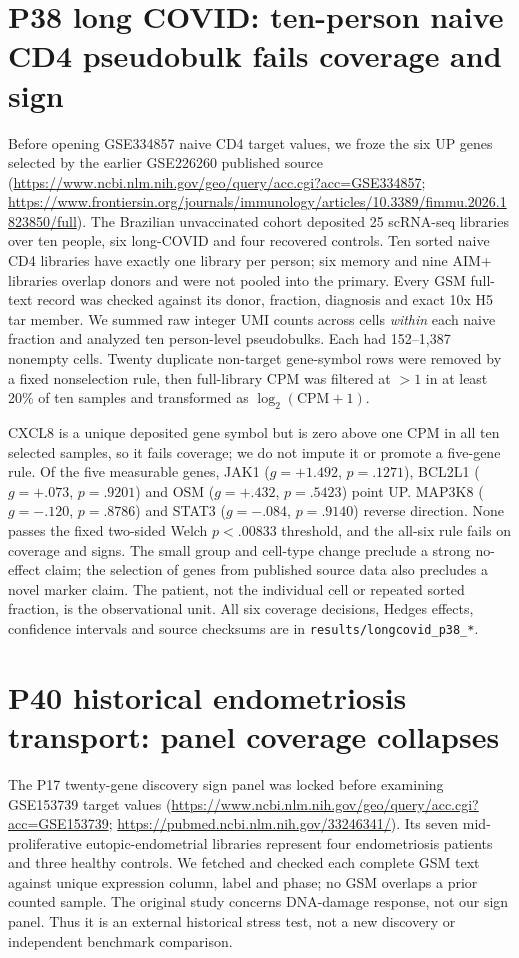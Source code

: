 \documentclass[11pt,a4paper]{article}
\begin{document}
\section{P38 long COVID: ten-person naive CD4 pseudobulk fails coverage and sign}
Before opening GSE334857 naive CD4 target values, we froze the six UP genes selected by the earlier GSE226260 published source (\url{https://www.ncbi.nlm.nih.gov/geo/query/acc.cgi?acc=GSE334857}; \url{https://www.frontiersin.org/journals/immunology/articles/10.3389/fimmu.2026.1823850/full}). The Brazilian unvaccinated cohort deposited 25 scRNA-seq libraries over ten people, six long-COVID and four recovered controls. Ten sorted naive CD4 libraries have exactly one library per person; six memory and nine AIM+ libraries overlap donors and were not pooled into the primary. Every GSM full-text record was checked against its donor, fraction, diagnosis and exact 10x H5 tar member. We summed raw integer UMI counts across cells \emph{within} each naive fraction and analyzed ten person-level pseudobulks. Each had 152--1,387 nonempty cells. Twenty duplicate non-target gene-symbol rows were removed by a fixed nonselection rule, then full-library CPM was filtered at $>1$ in at least 20\% of ten samples and transformed as $\log_2(\mathrm{CPM}+1)$.

CXCL8 is a unique deposited gene symbol but is zero above one CPM in all ten selected samples, so it fails coverage; we do not impute it or promote a five-gene rule. Of the five measurable genes, JAK1 ($g=+1.492$, $p=.1271$), BCL2L1 ($g=+.073$, $p=.9201$) and OSM ($g=+.432$, $p=.5423$) point UP. MAP3K8 ($g=-.120$, $p=.8786$) and STAT3 ($g=-.084$, $p=.9140$) reverse direction. None passes the fixed two-sided Welch $p<.00833$ threshold, and the all-six rule fails on coverage and signs. The small group and cell-type change preclude a strong no-effect claim; the selection of genes from published source data also precludes a novel marker claim. The patient, not the individual cell or repeated sorted fraction, is the observational unit. All six coverage decisions, Hedges effects, confidence intervals and source checksums are in \texttt{results/longcovid\_p38\_*}.

\section{P40 historical endometriosis transport: panel coverage collapses}
The P17 twenty-gene discovery sign panel was locked before examining GSE153739 target values (\url{https://www.ncbi.nlm.nih.gov/geo/query/acc.cgi?acc=GSE153739}; \url{https://pubmed.ncbi.nlm.nih.gov/33246341/}). Its seven mid-proliferative eutopic-endometrial libraries represent four endometriosis patients and three healthy controls. We fetched and checked each complete GSM text against unique expression column, label and phase; no GSM overlaps a prior counted sample. The original study concerns DNA-damage response, not our sign panel. Thus it is an external historical stress test, not a new discovery or independent benchmark comparison.
\end{document}
